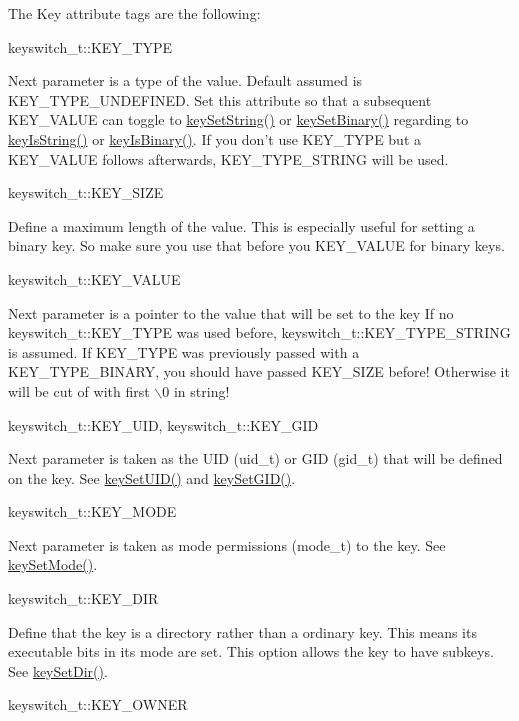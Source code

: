 The Key attribute tags are the following:
\begin{DoxyItemize}
\item keyswitch\_\-t::KEY\_\-TYPE \par
 Next parameter is a type of the value. Default assumed is KEY\_\-TYPE\_\-UNDEFINED. Set this attribute so that a subsequent KEY\_\-VALUE can toggle to \hyperlink{group__keyvalue_ga622bde1eb0e0c4994728331326340ef2}{keySetString()} or \hyperlink{group__keyvalue_gaa50a5358fd328d373a45f395fa1b99e7}{keySetBinary()} regarding to \hyperlink{group__keytest_gaea7670778abd07fee0fe8ac12a149190}{keyIsString()} or \hyperlink{group__keytest_ga9526b371087564e43e3dff8ad0dac949}{keyIsBinary()}. If you don't use KEY\_\-TYPE but a KEY\_\-VALUE follows afterwards, KEY\_\-TYPE\_\-STRING will be used.
\item keyswitch\_\-t::KEY\_\-SIZE \par
 Define a maximum length of the value. This is especially useful for setting a binary key. So make sure you use that before you KEY\_\-VALUE for binary keys.
\item keyswitch\_\-t::KEY\_\-VALUE \par
 Next parameter is a pointer to the value that will be set to the key If no keyswitch\_\-t::KEY\_\-TYPE was used before, keyswitch\_\-t::KEY\_\-TYPE\_\-STRING is assumed. If KEY\_\-TYPE was previously passed with a KEY\_\-TYPE\_\-BINARY, you should have passed KEY\_\-SIZE before! Otherwise it will be cut of with first $\backslash$0 in string!
\item keyswitch\_\-t::KEY\_\-UID, {\ttfamily keyswitch\_\-t::KEY\_\-GID} \par
 Next parameter is taken as the UID (uid\_\-t) or GID (gid\_\-t) that will be defined on the key. See \hyperlink{group__keymeta_gab5f284f5ecd261e0a290095f50ba1af7}{keySetUID()} and \hyperlink{group__keymeta_ga9e3d0fb3f7ba906e067727b9155d22e3}{keySetGID()}.
\item keyswitch\_\-t::KEY\_\-MODE \par
 Next parameter is taken as mode permissions (mode\_\-t) to the key. See \hyperlink{group__keymeta_ga8803037e35b9da1ce492323a88ff6bc3}{keySetMode()}.
\item keyswitch\_\-t::KEY\_\-DIR \par
 Define that the key is a directory rather than a ordinary key. This means its executable bits in its mode are set. This option allows the key to have subkeys. See \hyperlink{group__keymeta_gaae575bd86a628a15ee45baa860522e75}{keySetDir()}.
\item keyswitch\_\-t::KEY\_\-OWNER \par

\end{DoxyItemize}
